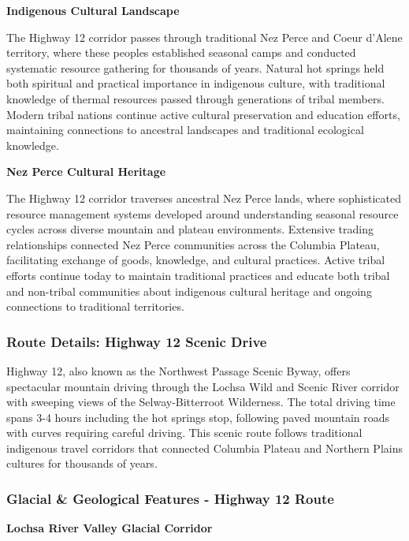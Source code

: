 \documentclass[
  11pt,
  letterpaper,
  DIV=10,
  numbers=noendperiod]{scrartcl}
\begin{document}
\textbf{Indigenous Cultural Landscape}

The Highway 12 corridor passes through traditional Nez Perce and Coeur
d'Alene territory, where these peoples established seasonal camps and
conducted systematic resource gathering for thousands of years. Natural
hot springs held both spiritual and practical importance in indigenous
culture, with traditional knowledge of thermal resources passed through
generations of tribal members. Modern tribal nations continue active
cultural preservation and education efforts, maintaining connections to
ancestral landscapes and traditional ecological knowledge.

\textbf{Nez Perce Cultural Heritage}

The Highway 12 corridor traverses ancestral Nez Perce lands, where
sophisticated resource management systems developed around understanding
seasonal resource cycles across diverse mountain and plateau
environments. Extensive trading relationships connected Nez Perce
communities across the Columbia Plateau, facilitating exchange of goods,
knowledge, and cultural practices. Active tribal efforts continue today
to maintain traditional practices and educate both tribal and non-tribal
communities about indigenous cultural heritage and ongoing connections
to traditional territories.

\subsubsection{Route Details: Highway 12 Scenic
Drive}\label{route-details-highway-12-scenic-drive}

Highway 12, also known as the Northwest Passage Scenic Byway, offers
spectacular mountain driving through the Lochsa Wild and Scenic River
corridor with sweeping views of the Selway-Bitterroot Wilderness. The
total driving time spans 3-4 hours including the hot springs stop,
following paved mountain roads with curves requiring careful driving.
This scenic route follows traditional indigenous travel corridors that
connected Columbia Plateau and Northern Plains cultures for thousands of
years.

\subsubsection{Glacial \& Geological Features - Highway 12
Route}\label{glacial-geological-features---highway-12-route}

\textbf{Lochsa River Valley Glacial Corridor}
\end{document}
